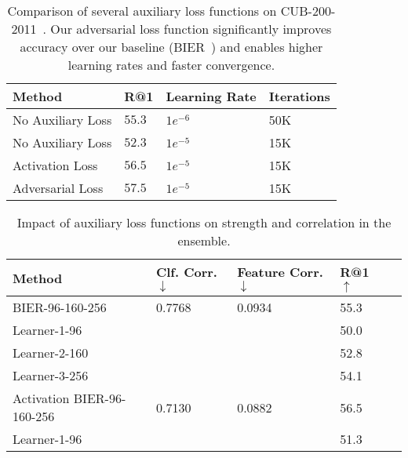 \documentclass[10pt,journal,compsoc]{IEEEtran}
\begin{document}
\begin{table}[htbp]
    \caption{Comparison of several auxiliary loss functions on CUB-200-2011~\cite{WahCUB_200_2011}. Our adversarial loss function significantly improves accuracy over our baseline (\ac{BIER}~\cite{opitz2017bier}) and enables higher learning rates and faster convergence.}
    \label{tbl:eval-adversarial-loss-function}
    \renewcommand{\arraystretch}{1.3}
    \centering
    \begin{tabular}{llll}
        \hline
        Method & R@1 & Learning Rate & Iterations \\
        \hline
        No Auxiliary Loss & $55.3$ & $1e^{-6}$ & 50K \\
        No Auxiliary Loss & $52.3$ & $1e^{-5}$ & 15K \\
        Activation Loss  & $56.5$  & $1e^{-5}$ & 15K \\
        Adversarial Loss & $\boldsymbol{57.5}$ & $1e^{-5}$ & 15K  \\
        \hline
    \end{tabular}
\end{table}\begin{table}[htbp]
    \caption{Impact of auxiliary loss functions on strength and correlation in the ensemble.}
    \label{tbl:eval-auxiliary-loss-strength-correlation}
    \renewcommand{\arraystretch}{1.3}
    \centering
    \begin{tabular}{lllll}
        \hline
        Method                         & Clf. Corr. $\downarrow$ & Feature Corr. $\downarrow$    & R@1 $\uparrow$            \\
        \hline
        BIER-96-160-256                & 0.7768     & 0.0934           & 55.3  \\
        \hspace{2mm}  Learner-1-96       &                  &                     & 50.0 \\
        \hspace{2mm}  Learner-2-160      &                  &                     & 52.8 \\
        \hspace{2mm}  Learner-3-256      &                  &                     & 54.1 \\
        \hline
        Activation BIER-96-160-256     & 0.7130     &  0.0882               &            56.5     \\
        \hspace{2mm}  Learner-1-96       &                  &                     & 51.3 \\

\end{tabular}
\end{table}
\end{document}
